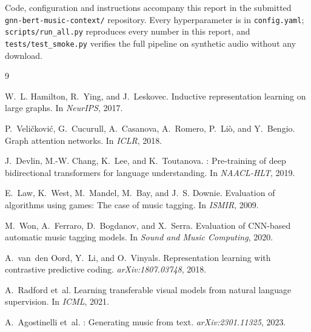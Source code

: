 \documentclass{article}
\begin{document}
Code, configuration and instructions accompany this report in the submitted
\texttt{gnn-bert-music-context/} repository. Every hyperparameter is in
\texttt{config.yaml}; \texttt{scripts/run\_all.py} reproduces every number in
this report, and \texttt{tests/test\_smoke.py} verifies the full pipeline on
synthetic audio without any download.

\begin{thebibliography}{9}

W.~L. Hamilton, R.~Ying, and J.~Leskovec.
\newblock Inductive representation learning on large graphs.
\newblock In \emph{NeurIPS}, 2017.

P.~Veli\v{c}kovi\'{c}, G.~Cucurull, A.~Casanova, A.~Romero, P.~Li\`{o}, and Y.~Bengio.
\newblock Graph attention networks.
\newblock In \emph{ICLR}, 2018.

J.~Devlin, M.-W. Chang, K.~Lee, and K.~Toutanova.
: Pre-training of deep bidirectional transformers for language understanding.
\newblock In \emph{NAACL-HLT}, 2019.

E.~Law, K.~West, M.~Mandel, M.~Bay, and J.~S. Downie.
\newblock Evaluation of algorithms using games: The case of music tagging.
\newblock In \emph{ISMIR}, 2009.

M.~Won, A.~Ferraro, D.~Bogdanov, and X.~Serra.
\newblock Evaluation of {CNN}-based automatic music tagging models.
\newblock In \emph{Sound and Music Computing}, 2020.

A.~van~den Oord, Y.~Li, and O.~Vinyals.
\newblock Representation learning with contrastive predictive coding.
\newblock \emph{arXiv:1807.03748}, 2018.

A.~Radford et~al.
\newblock Learning transferable visual models from natural language supervision.
\newblock In \emph{ICML}, 2021.

A.~Agostinelli et~al.
: Generating music from text.
\newblock \emph{arXiv:2301.11325}, 2023.

\end{thebibliography}
\end{document}
